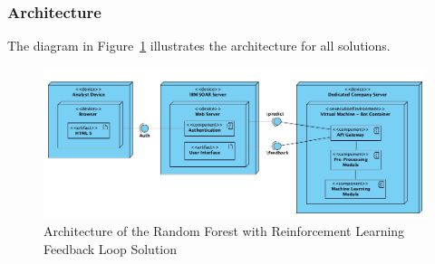 \subsubsection{Architecture}

The diagram in Figure~\ref{fig:architecture} illustrates the architecture for all solutions.

\begin{figure}[h!]
    \centering
    \includegraphics[width=\textwidth]{ch3/assets/archquiteture.png}
    \caption{Architecture of the Random Forest with Reinforcement Learning Feedback Loop Solution}
    \label{fig:architecture}
\end{figure}


